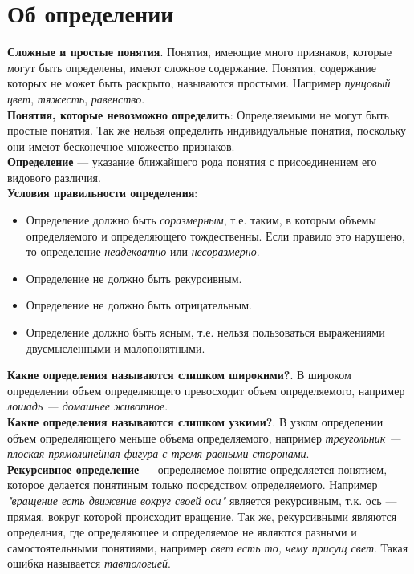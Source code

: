 \documentclass{article}
\begin{document}
\section{Об определении}
\textbf{Сложные и простые понятия}. Понятия, имеющие много признаков, которые могут быть определены, имеют сложное содержание. Понятия, содержание которых не может быть раскрыто, называются простыми. Например \textit{пунцовый цвет}, \textit{тяжесть}, \textit{равенство}.
\\
\textbf{Понятия, которые невозможно определить}: Определяемыми не могут быть простые понятия. Так же нельзя определить индивидуальные понятия, поскольку они имеют бесконечное множество признаков.
\\
\textbf{Определение} --- указание ближайшего рода понятия с присоединением его видового различия.
\\
\textbf{Условия правильности определения}: 
\begin{itemize}
\item Определение должно быть \textit{соразмерным}, т.е. таким, в которым объемы определяемого и определяющего тождественны. Если правило это нарушено, то определение \textit{неадекватно} или \textit{несоразмерно}.
\item Определение не должно быть рекурсивным.
\item Определение не должно быть отрицательным.
\item Определение должно быть ясным, т.е. нельзя пользоваться выражениями двусмысленными и малопонятными.
\end{itemize}
\textbf{Какие определения называются слишком широкими?}. В широком определении объем определяющего превосходит объем определяемого, например \textit{лошадь --- домашнее животное}. 
\\
\textbf{Какие определения называются слишком узкими?}. В узком определении объем определяющего меньше объема определяемого, например \textit{треугольник --- плоская прямолинейная фигура с тремя равными сторонами}.
\\
\textbf{Рекурсивное определение} --- определяемое понятие определяется понятием, которое делается понятиным только посредством определяемого. Например \textit{"вращение есть движение вокруг своей оси"} является рекурсивным, т.к. ось --- прямая, вокруг которой происходит вращение. Так же, рекурсивными являются определния, где определяющее и определяемое не являются разными и самостоятельными понятиями, например \textit{свет есть то, чему присущ свет}. Такая ошибка называется \textit{тавтологией}.
\\
\end{document}
